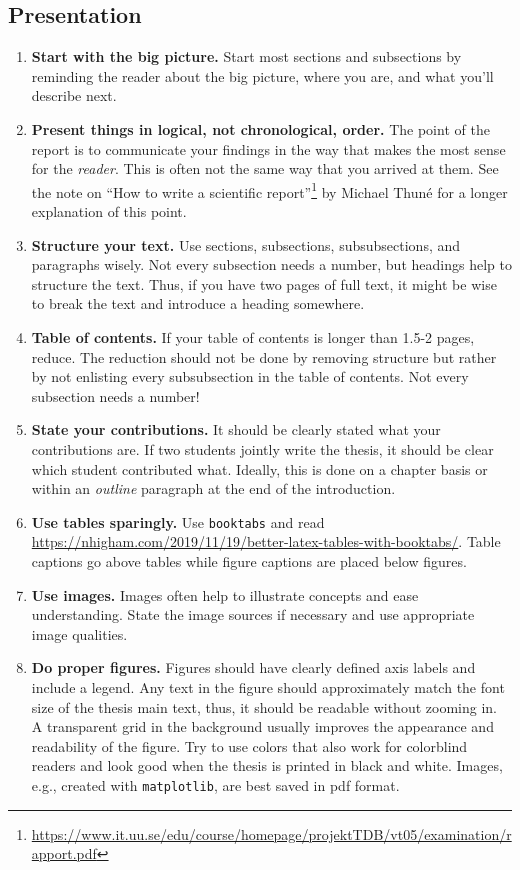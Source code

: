 \documentclass[11pt]{article}
\begin{document}
\subsection*{Presentation}
\begin{enumerate}
     \item \textbf{Start with the big picture.} Start most sections and subsections by reminding the reader about the big picture, where you are, and what you'll describe next.
    
    \item \textbf{Present things in logical, not chronological, order.} The point of the report is to communicate your findings in the way that makes the most sense for the \emph{reader}. This is often not the same way that you arrived at them. See the note on ``How to write a scientific report''\footnote{\url{https://www.it.uu.se/edu/course/homepage/projektTDB/vt05/examination/rapport.pdf}} by Michael Thuné for a longer explanation of this point.
    
     \item \textbf{Structure your text.} Use sections, subsections, subsubsections, and paragraphs wisely. Not every subsection needs a number, but headings help to structure the text. Thus, if you have two pages of full text, it might be wise to break the text and introduce a heading somewhere.
     
    \item \textbf{Table of contents.} If your table of contents is longer than 1.5-2 pages, reduce. The reduction should not be done by removing structure but rather by not enlisting every subsubsection in the table of contents. Not every subsection needs a number!

    \item \textbf{State your contributions.} It should be clearly stated what your contributions are. If two students jointly write the thesis, it should be clear which student contributed what. Ideally, this is done on a chapter basis or within an \textit{outline} paragraph at the end of the introduction. 

    \item \textbf{Use tables sparingly.} Use \texttt{booktabs} and read \url{https://nhigham.com/2019/11/19/better-latex-tables-with-booktabs/}. Table captions go above tables while figure captions are placed below figures.
    
    \item \textbf{Use images.} Images often help to illustrate concepts and ease understanding. State the image sources if necessary and use appropriate image qualities. 
    
    \item \textbf{Do proper figures.} Figures should have clearly defined axis labels and include a legend. Any text in the figure should approximately match the font size of the thesis main text, thus, it should be readable without zooming in. A transparent grid in the background usually improves the appearance and readability of the figure. Try to use colors that also work for colorblind readers and look good when the thesis is printed in black and white. Images, e.g., created with \texttt{matplotlib}, are best saved in pdf format. 
\end{enumerate}
\end{document}
